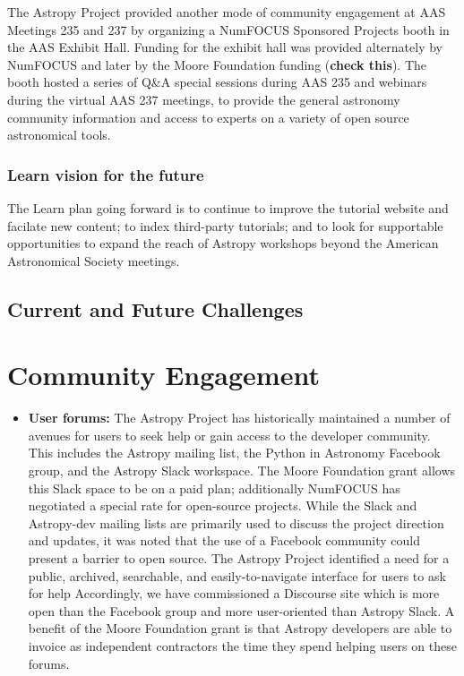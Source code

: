 \documentclass[modern]{aastex631}
\begin{document}
\begin{description}
The Astropy Project provided another mode of community engagement at AAS
Meetings 235 and 237 by organizing a NumFOCUS Sponsored Projects booth in the
AAS Exhibit Hall.
Funding for the exhibit hall was provided alternately by NumFOCUS and later by
the Moore Foundation funding (\textbf{check this}).
The booth hosted a series of Q\&A special sessions during AAS 235 and webinars
during the virtual AAS 237 meetings, to provide the general astronomy community
information and access to experts on a variety of open source astronomical
tools.
\end{description}

\subsubsection{Learn vision for the future}

The Learn plan going forward is to continue to improve the tutorial website and
facilate new content;
to index third-party tutorials; and to look for supportable opportunities to
expand the reach of Astropy workshops beyond the American Astronomical Society
meetings.



\subsection{Current and Future Challenges}

\section{Community Engagement}

\begin{itemize}
\item {\bf User forums:} The Astropy Project has historically maintained a number of avenues for users to seek help or gain access to the developer community. This includes the Astropy mailing list, the Python in Astronomy Facebook group, and the Astropy Slack workspace. The Moore Foundation grant allows this Slack space to
be on a paid plan; additionally NumFOCUS has negotiated a special rate for
open-source projects. While the Slack and Astropy-dev mailing lists are primarily used to discuss the project direction and updates, it was noted that the use of a Facebook community could present a barrier to open source. The Astropy Project identified a need for a public, archived, searchable, and easily-to-navigate interface for users to ask for help Accordingly, we have commissioned
a Discourse site which is more open than the Facebook group and more user-oriented
than Astropy Slack. A benefit of the Moore Foundation grant is that Astropy
developers are able to invoice as independent contractors the time they
spend helping users on these forums.
\end{itemize}
\end{document}
